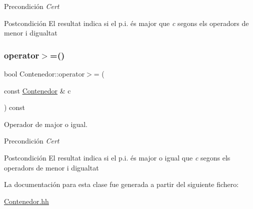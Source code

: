 \begin{DoxyPrecond}{Precondición}
{\itshape Cert} 
\end{DoxyPrecond}
\begin{DoxyPostcond}{Postcondición}
El resultat indica si el p.\+i. és major que {\itshape c} segons els operadors de menor i d\textquotesingle{}igualtat 
\end{DoxyPostcond}
\mbox{\label{class_contenedor_a7f95853ed98513ffc10c9213df656cfd}} 
\subsubsection{\texorpdfstring{operator$>$=()}{operator>=()}}
{\footnotesize\ttfamily bool Contenedor\+::operator$>$= (\begin{DoxyParamCaption}\item[{const \hyperlink{class_contenedor}{Contenedor} \&}]{c }\end{DoxyParamCaption}) const}



Operador de major o igual. 

\begin{DoxyPrecond}{Precondición}
{\itshape Cert} 
\end{DoxyPrecond}
\begin{DoxyPostcond}{Postcondición}
El resultat indica si el p.\+i. és major o igual que {\itshape c} segons els operadors de menor i d\textquotesingle{}igualtat 
\end{DoxyPostcond}


La documentación para esta clase fue generada a partir del siguiente fichero\+:\begin{DoxyCompactItemize}
\item 
\hyperlink{_contenedor_8hh}{Contenedor.\+hh}\end{DoxyCompactItemize}

